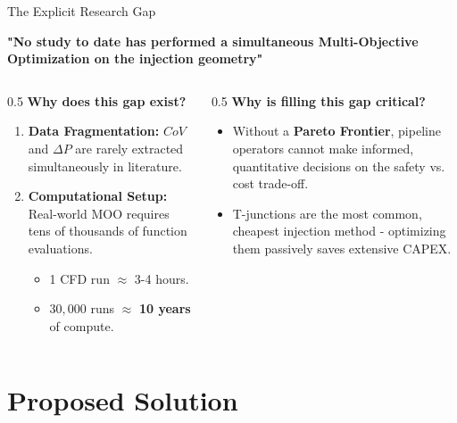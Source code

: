 \documentclass[10pt, aspectratio=169]{beamer}
\begin{document}
\begin{frame}{The Explicit Research Gap}
    \begin{center}
        \Large \alert{\textbf{"No study to date has performed a simultaneous Multi-Objective Optimization on the injection geometry"}}
    \end{center}
    
    \vspace{0.8em}
    \begin{columns}[T]
        \begin{column}{0.5\textwidth}
            \textbf{Why does this gap exist?}
            \begin{enumerate}
                \small
                \item \textbf{Data Fragmentation:} $CoV$ and $\Delta P$ are rarely extracted simultaneously in literature.
                \item \textbf{Computational Setup:} Real-world MOO requires tens of thousands of function evaluations.
                \begin{itemize}
                    \scriptsize
                    \item 1 CFD run $\approx$ 3-4 hours.
                    \item $30,000$ runs $\approx$ \textbf{10 years} of compute.
                \end{itemize}
            \end{enumerate}
        \end{column}
        \begin{column}{0.5\textwidth}
            \textbf{Why is filling this gap critical?}
            \begin{itemize}
                \small
                \item Without a \textbf{Pareto Frontier}, pipeline operators cannot make informed, quantitative decisions on the safety vs. cost trade-off.
                \item T-junctions are the most common, cheapest injection method - optimizing them passively saves extensive CAPEX.
            \end{itemize}
        \end{column}
    \end{columns}
\end{frame}

\section{Proposed Solution}
\end{document}
